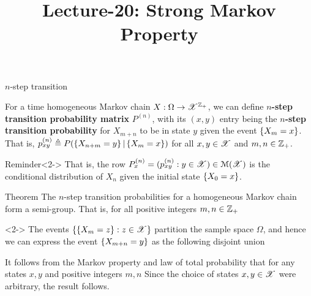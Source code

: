 \documentclass[12pt,aspectratio=169]{beamer}
\title{ Lecture-20: Strong Markov Property}
\date{}
\begin{document}
\pagestyle{empty}
\maketitle

\begin{frame}{$n$-step transition}
\begin{Definition}
For a time homogeneous Markov chain $X:\Omega\to\mathscr{X}^{\mathbb{Z}_+}$, we can define \textbf{$n$-step transition probability matrix} $P^{(n)}$, 
with its $(x,y)$ entry being the \textbf{$n$-step transition probability} for $X_{m+n}$ to be in state $y$ given the event $\left\{X_m = x\right\}$. 
That is, 
$
p_{xy}^{(n)} \triangleq P(\left\{X_{n+m} = y \right\}|\left\{ X_m = x\right\}) 
$
for all $x,y \in \mathscr{X}$ and $m,n \in \mathbb{Z}_+$.
\end{Definition}
\begin{block}{Reminder}<2->
That is, the row $P^{(n)}_x = (p^{(n)}_{xy}: y \in \mathscr{X}) \in \mathcal{M}(\mathscr{X})$ is the conditional distribution of $X_n$ given the initial state $\left\{X_0 = x\right\}$. 
\end{block}
\end{frame}


\begin{frame}
\begin{block}{Theorem} 
The $n$-step transition probabilities for a homogeneous Markov chain form a semi-group. 
That is, for all positive integers $m,n \in \mathbb{Z}_+$
\end{block}

\begin{Proof}<2-> 
The events $\left\{ \left\{X_m = z\right\}: z \in \mathscr{X}\right\}$ partition the sample space $\Omega$, and hence we can express the event $\left\{X_{m+n} = y\right\}$ as the following disjoint union
\end{Proof}
\end{frame}


\begin{frame}
\begin{Proof}
It follows from the Markov property and law of total probability that for any states $x, y$ and positive integers $m, n$
Since the choice of  states $x,y \in \mathscr{X}$ were arbitrary, the result follows. 
\end{Proof}
\end{frame}
\end{document}
